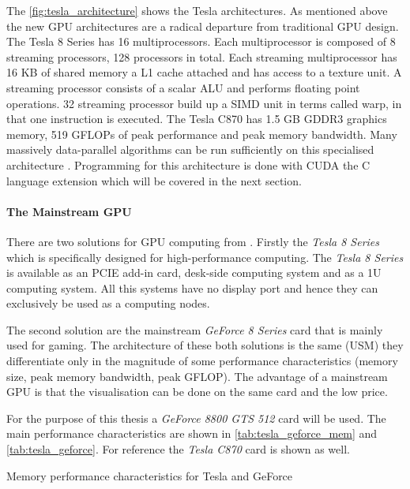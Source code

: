 The \autoref{fig:tesla_architecture} shows the Tesla architectures. As mentioned
above the new \gls{GPU} architectures are a radical departure from traditional
\gls{GPU} design. The Tesla 8 Series has 16 multiprocessors. Each multiprocessor
is composed of 8 streaming processors, 128 processors in total. Each streaming
multiprocessor has 16 \gls{KB} of shared memory a L1 cache attached and has access
to a texture unit. A streaming processor consists of a scalar \gls{ALU} and
performs floating point operations. 32 streaming processor build up a \gls{SIMD}
unit in {} terms called warp, in that one instruction is executed. The Tesla
C870 has 1.5 \gls{GB} \gls{GDDR3} graphics memory, 519 \glspl{GFLOP} of peak
performance and  peak memory bandwidth. Many massively
data-parallel algorithms can be run sufficiently on this specialised
architecture \citep{citeulike:3145468}. Programming for this architecture is
done with \gls{CUDA} the C language extension which will be covered in the next
section.


\paragraph{The Mainstream GPU} %
\label{par:the_mainstream_gpu}
There are two solutions for \gls{GPU} computing from {}. Firstly the
\emph{Tesla 8 Series} which is specifically designed for high-performance
computing. The \emph{Tesla 8 Series} is available as an \gls{PCIE} add-in card,
desk-side computing system and as a \gls{1U} computing system. All this systems have
no display port and hence they can exclusively be used as a computing nodes. 

The second solution are the mainstream \emph{GeForce 8 Series} card that
is mainly used for gaming. The architecture of these both solutions is the same
(\gls{USM}) they differentiate only in the magnitude of some performance
characteristics (memory size, peak memory bandwidth, peak \gls{GFLOP}). The
advantage of a mainstream \gls{GPU} is that the visualisation can be done on the
same card and the low price. 

For the purpose of this thesis a \emph{GeForce 8800 GTS 512} card will be
used. The main performance characteristics are shown in
\autoref{tab:tesla_geforce_mem} and \autoref{tab:tesla_geforce}. For reference
the \emph{Tesla C870} card is shown as well.

\begin{table}[ht]
	\centering
  	\caption{Memory performance characteristics for Tesla and GeForce}
  	\label{tab:tesla_geforce_mem}
\end{table}

